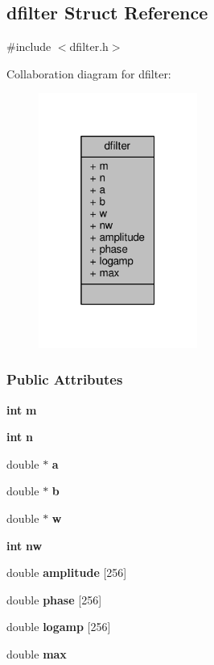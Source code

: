 \subsection{dfilter Struct Reference}
\label{structdfilter}


{\ttfamily \#include $<$dfilter.\+h$>$}



Collaboration diagram for dfilter\+:
\nopagebreak
\begin{figure}[H]
\begin{center}
\leavevmode
\includegraphics[width=148pt]{dd/d12/structdfilter__coll__graph}
\end{center}
\end{figure}
\subsubsection*{Public Attributes}
\begin{DoxyCompactItemize}
\item 
{\bf int} {\bf m}
\item 
{\bf int} {\bf n}
\item 
double $\ast$ {\bf a}
\item 
double $\ast$ {\bf b}
\item 
double $\ast$ {\bf w}
\item 
{\bf int} {\bf nw}
\item 
double {\bf amplitude} [256]
\item 
double {\bf phase} [256]
\item 
double {\bf logamp} [256]
\item 
double {\bf max}
\end{DoxyCompactItemize}



